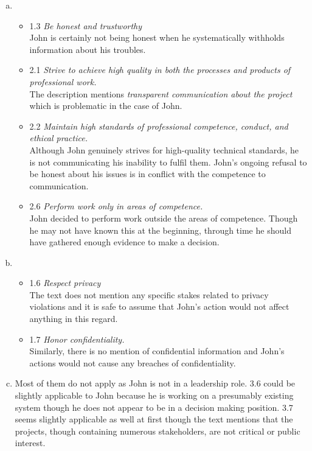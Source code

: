 \documentclass[a4paper, 11pt]{article}
\begin{document}
\begin{enumerate}[(a)]
    \item
    \begin{itemize}
        \item 1.3 \emph{Be honest and trustworthy}\\
        John is certainly not being honest when he systematically withholds information about his troubles. 
        \item 2.1 \emph{Strive to achieve high quality in both the processes and products of professional work.}\\
        The description mentions \emph{transparent communication about the project} which is problematic in the case of John.
        \item 2.2 \emph{Maintain high standards of professional competence, conduct, and ethical practice.}\\
        Although John genuinely strives for high-quality technical standards, he is not communicating his inability to fulfil them. 
        John's ongoing refusal to be honest about his issues is in conflict with the competence to communication.
        \item 2.6 \emph{Perform work only in areas of competence.}\\
        John decided to perform work outside the areas of competence. Though he may not have known this at the beginning, through time he should have gathered enough evidence to make a decision.
    \end{itemize}
    
    \item
        \begin{itemize}
        \item 1.6 \emph{Respect privacy}\\
        The text does not mention any specific stakes related to privacy violations and it is safe to assume that John's action would not affect anything in this regard.
        \item 1.7 \emph{Honor confidentiality.}\\
        Similarly, there is no mention of confidential information and John's actions would not cause any breaches of confidentiality.
    \end{itemize}
    
    \item
    Most of them do not apply as John is not in a leadership role.
    3.6 could be slightly applicable to John because he is working on a presumably existing system though he does not appear to be in a decision making position.
    3.7 seems slightly applicable as well at first though the text mentions that the projects, though containing numerous stakeholders, are not critical or public interest.
    

\end{enumerate}
\end{document}
